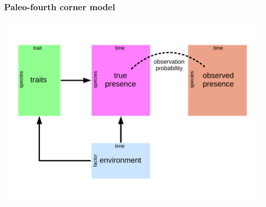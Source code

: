 \documentclass{beamer}
\begin{document}

\begin{frame}
  \frametitle{Paleo-fourth corner model}

  \begin{center}
    \includegraphics[height=0.8\textheight,width=\textwidth,keepaspectratio=true]{figure/paleo_fourth_corner}
  \end{center}
\end{frame}
\end{document}

